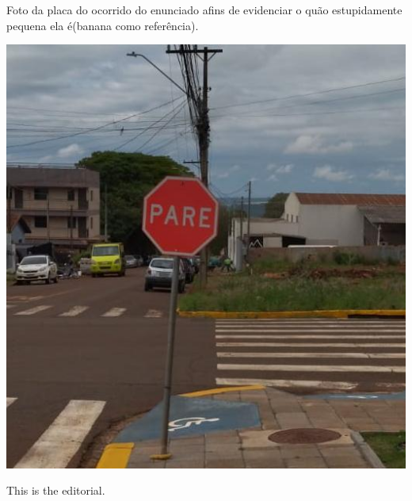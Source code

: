 Foto da placa do ocorrido do enunciado afins de evidenciar o quão estupidamente pequena ela é(banana como referência).

\includegraphics[scale=0.30]{placa.png}

This is the editorial.
